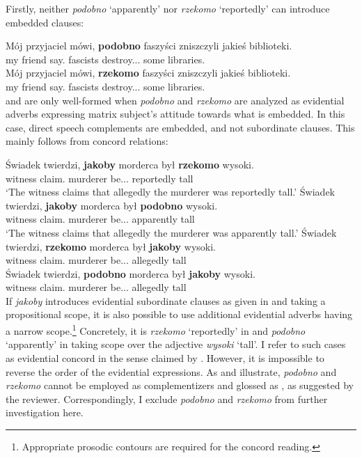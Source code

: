 \documentclass[output=paper
,modfonts
,nonflat]{langsci/langscibook}
\begin{document}
Firstly, neither \emph{podobno}  `apparently' nor \emph{rzekomo} `reportedly' can introduce embedded clauses:  

\ea \ea \gll	*Mój przyjaciel mówi, \textbf{podobno} faszyści zniszczyli jakieś biblioteki.  \label{podobno} \\
		my friend say.{\thirdperson}{\sg} {\comp}  fascists destroy.{\lptcp}.{\vir}.{\pl} some libraries. \\
	\ex\gll	*Mój przyjaciel mówi, \textbf{rzekomo} faszyści zniszczyli jakieś biblioteki. \label{rzekomo} \\
		my friend say.{\thirdperson}{\sg} {\comp}  fascists destroy.{\lptcp}.{\vir}.{\pl} some libraries. \\
          \z\z
{} and  are only well-formed when \emph{podobno} and \emph{rzekomo} are analyzed as evidential adverbs expressing matrix subject's attitude towards what is embedded. In this case, direct speech complements are embedded, and not subordinate clauses.  This mainly follows from concord relations: 

\ea \ea \gll	Świadek twierdzi, \textbf{jakoby} morderca był \textbf{rzekomo} wysoki. \label{tall1} \\
		witness claim.{\thirdperson}{\sg} {\comp} murderer be.{\lptcp}.{\thirdperson}{\sg}.{\masc} reportedly tall \\
	\glt	 `The witness claims that allegedly the murderer was reportedly tall.' 
	\ex\gll	Świadek twierdzi, \textbf{jakoby} morderca był \textbf{podobno} wysoki. \label{tall2} \\
		witness claim.{\thirdperson}{\sg} {\comp} murderer be.{\lptcp}.{\thirdperson}{\sg}.{\masc} apparently tall \\
	\glt	 `The witness claims that allegedly the murderer was apparently tall.'
	\ex\gll	*Świadek twierdzi, \textbf{rzekomo} morderca był \textbf{jakoby} wysoki. \label{tall3} \\
		witness claim.{\thirdperson}{\sg} {\comp} murderer be.{\lptcp}.{\thirdperson}{\sg}.{\masc} allegedly tall \\
	\ex\gll	*Świadek twierdzi, \textbf{podobno} morderca był \textbf{jakoby} wysoki. \label{tall4} \\
		witness claim.{\thirdperson}{\sg} {\comp} murderer be.{\lptcp}.{\thirdperson}{\sg}.{\masc} allegedly tall \\
\z\z
If \emph{jakoby} introduces evidential subordinate clauses as given in  and  taking a propositional scope, it is also possible to use additional evidential adverbs having a narrow scope.\footnote{Appropriate prosodic contours are required for the concord reading. 
}
Concretely, it is \emph{rzekomo}  `reportedly' in  and \emph{podobno} `apparently' in  taking scope over the adjective \emph{wysoki} `tall'. I refer to such cases as evidential concord in the sense claimed by \textcite{Schenner2007}. However, it is impossible to reverse the order of the evidential expressions. As  and  illustrate, \emph{podobno} and \emph{rzekomo} cannot be employed as complementizers and glossed as {\comp}, as suggested by the reviewer. Correspondingly, I exclude \emph{podobno} and \emph{rzekomo} from further investigation here. 
\end{document}
